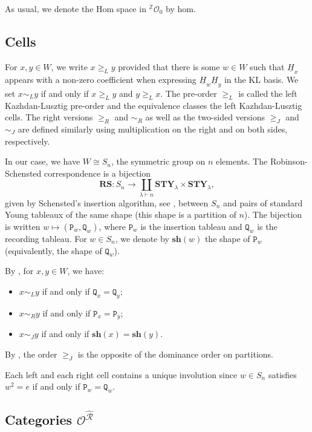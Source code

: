 \documentclass[a4paper]{amsart}
\begin{document}
As usual, we denote the Hom space in ${}^\mathbb{Z}\mathcal{O}_0$
by $\mathrm{hom}$.

\subsection{Cells}\label{s2.5}

For $x,y\in W$, we write $x\geq_L y$ provided that there is some $w\in W$
such that $\underline{H}_x$ appears with a non-zero coefficient when
expressing $\underline{H}_w\underline{H}_y$ in the KL basis.
We set $x\sim_L y$ if and only if $x\geq_L y$ and $y\geq_L x$.
The pre-order $\geq_L$ is called the left Kazhdan-Lusztig pre-order
and the equivalence classes the left Kazhdan-Lusztig cells.
The right versions $\geq_R$ and $\sim_R$ as well as  the
two-sided versions $\geq_J$ and $\sim_J$ are defined similarly
using multiplication on the right and on both sides, respectively.

In our case, we have $W\cong S_n$, the symmetric group on $n$
elements. The Robinson-Schensted correspondence is a bijection
\begin{displaymath}
\mathbf{RS}:S_n\to
\coprod_{\lambda\vdash n}\mathbf{STY}_\lambda\times \mathbf{STY}_\lambda,
\end{displaymath}
given by Schensted's insertion algorithm, see \cite{Sa,Sch}, between 
$S_n$ and pairs of standard Young tableaux of the same shape
(this shape is a partition of $n$). The bijection is written
$w\mapsto (\mathtt{P}_w,\mathtt{Q}_w)$, where $\mathtt{P}_w$
is the insertion tableau and $\mathtt{Q}_w$
is the recording tableau. For $w\in S_n$, we denote by 
$\mathbf{sh}(w)$ the shape of $\mathtt{P}_w$
(equivalently, the shape of $\mathtt{Q}_w$).

By \cite{KL}, for $x,y\in W$, we have:
\begin{itemize}
\item $x\sim_L y$ if and only if $\mathtt{Q}_x=\mathtt{Q}_y$;
\item $x\sim_R y$ if and only if $\mathtt{P}_x=\mathtt{P}_y$;
\item $x\sim_J y$ if and only if $\mathbf{sh}(x)=\mathbf{sh}(y)$.
\end{itemize}
By \cite{Ge}, the order  $\geq_J$ is the opposite of the
dominance order on partitions.

Each left and each right cell contains a unique involution
since $w\in S_n$ satisfies $w^2=e$ if and only if 
$\mathtt{P}_w=\mathtt{Q}_w$.

\subsection{Categories $\mathcal{O}^{\hat{\mathcal{R}}}$}\label{s2.6}
\end{document}
